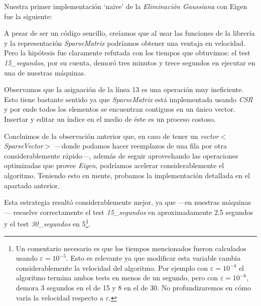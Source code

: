 \vspace{1em}
Nuestra primer implementación `naive' de la \textit{Eliminación Gaussiana} con Eigen fue la siguiente:

\vspace{1em}


\vspace{1em}
A pesar de ser un código sencillo, creíamos que al usar las funciones de la librería y la representación \textit{SparseMatrix} podríamos obtener una ventaja en velocidad. Pero la hipótesis fue claramente refutada con los tiempos que obtuvimos: el test \textit{15\_segundos}, por su cuenta, demoró tres minutos y trece segundos en ejecutar en una de nuestras máquinas.

\vspace{1em}
Observamos que la asignación de la línea 13 es una operación muy ineficiente. Esto tiene bastante sentido ya que \textit{SparseMatrix} está implementada usando \textit{CSR} y por ende todos los elementos se encuentran contiguos en un único vector. Insertar y editar un índice en el medio de éste es un proceso costoso.
 
\vspace{1em}
Concluimos de la observación anterior que, en caso de tener un \textit{vector$<$SparseVector$>$} ---donde podamos hacer reemplazos de una fila por otra considerablemente rápido---, además de seguir aprovechando las operaciones optimizadas que provee \textit{Eigen}, podríamos acelerar considerablemente el algoritmo. Teniendo esto en mente, probamos la implementación detallada en el apartado anterior.

Esta estrategia resultó considerablemente mejor, ya que ---en nuestras máquinas--- resuelve correctamente el test \textit{15\_segundos} en aproximadamente 2.5 segundos y el test \textit{30\_segundos} en 5\footnote{Un comentario necesario es que los tiempos mencionados fueron calculados usando $\varepsilon = 10^{-5}$. Esto es relevante ya que modificar esta variable cambia considerablemente la velocidad del algoritmo. Por ejemplo con $\varepsilon = 10^{-4}$ el algoritmo termina ambos tests en menos de un segundo, pero con $\varepsilon = 10^{-6}$, demora 3 segundos en el de 15 y 8 en el de 30. No profundizaremos en cómo varía la velocidad respecto a $\varepsilon$.
}.


